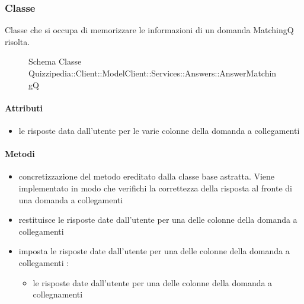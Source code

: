 \subsubsection{Classe }
Classe che si occupa di memorizzare le informazioni di un domanda MatchingQ risolta.
\begin{figure}[H]
\centering
\noindent{}
\caption[Schema Classe AnswerMatchingQ]{Schema Classe Quizzipedia::Client::ModelClient::Services::Answers::AnswerMatchingQ}
\end{figure}
\paragraph{Attributi}
\begin{itemize}
\item {}
\newline
le risposte data dall'utente per le varie colonne della domanda a collegamenti
\end{itemize}
\paragraph{Metodi}
\begin{itemize}
\item {}
\newline
concretizzazione del metodo ereditato dalla classe base astratta. Viene implementato in modo che verifichi la correttezza della risposta al fronte di una domanda a collegamenti
\newline
\item {}
\newline
restituisce le risposte date dall'utente per una delle colonne della domanda a collegamenti
\newline
\item {}
\newline
imposta le risposte date dall'utente per una delle colonne della domanda a collegamenti
\newline
{} :
\begin{itemize}
\item {}
\newline
le risposte date dall'utente per una delle colonne della domanda a collegnamenti
\end{itemize}
\end{itemize}
